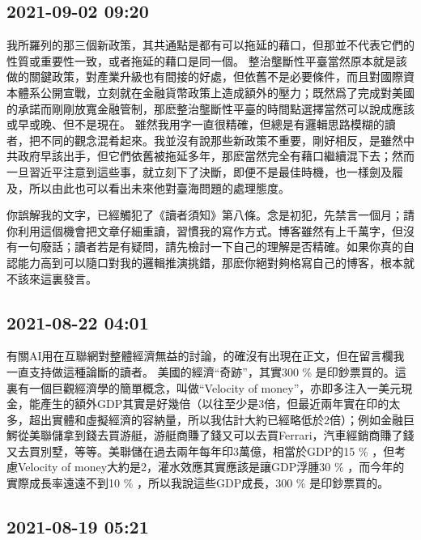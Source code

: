 \documentclass[twocolumn]{ctexart}
\begin{document}
\subsection*{2021-09-02 09:20}

我所羅列的那三個新政策，其共通點是都有可以拖延的藉口，但那並不代表它們的性質或重要性一致，或者拖延的藉口是同一個。
整治壟斷性平臺當然原本就是該做的關鍵政策，對產業升級也有間接的好處，但依舊不是必要條件，而且對國際資本體系公開宣戰，立刻就在金融貨幣政策上造成額外的壓力；既然爲了完成對美國的承諾而剛剛放寬金融管制，那麽整治壟斷性平臺的時間點選擇當然可以說成應該或早或晚、但不是現在。
雖然我用字一直很精確，但總是有邏輯思路模糊的讀者，把不同的觀念混肴起來。我並沒有說那些新政策不重要，剛好相反，是雖然中共政府早該出手，但它們依舊被拖延多年，那麽當然完全有藉口繼續混下去；然而一旦習近平注意到這些事，就立刻下了決斷，即便不是最佳時機，也一樣劍及履及，所以由此也可以看出未來他對臺海問題的處理態度。

你誤解我的文字，已經觸犯了《讀者須知》第八條。念是初犯，先禁言一個月；請你利用這個機會把文章仔細重讀，習慣我的寫作方式。博客雖然有上千萬字，但沒有一句廢話；讀者若是有疑問，請先檢討一下自己的理解是否精確。如果你真的自認能力高到可以隨口對我的邏輯推演挑錯，那麽你絕對夠格寫自己的博客，根本就不該來這裏發言。
\subsection*{2021-08-22 04:01}

有關AI用在互聯網對整體經濟無益的討論，的確沒有出現在正文，但在留言欄我一直支持做這種論斷的讀者。
美國的經濟“奇跡”，其實300 \% 是印鈔票買的。這裏有一個巨觀經濟學的簡單概念，叫做“Velocity of money”，亦即多注入一美元現金，能產生的額外GDP其實是好幾倍（以往至少是3倍，但最近兩年實在印的太多，超出實體和虛擬經濟的容納量，所以我估計大約已經略低於2倍）；例如金融巨鰐從美聯儲拿到錢去買游艇，游艇商賺了錢又可以去買Ferrari，汽車經銷商賺了錢又去買別墅，等等。美聯儲在過去兩年每年印3萬億，相當於GDP的15 \% ，但考慮Velocity of money大約是2，灌水效應其實應該是讓GDP浮腫30 \% ，而今年的實際成長率遠遠不到10 \% ，所以我說這些GDP成長，300 \% 是印鈔票買的。
\subsection*{2021-08-19 05:21}
\end{document}
